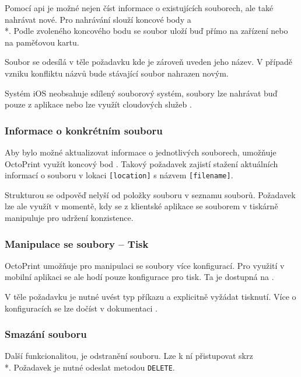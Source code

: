 Pomocí \acrshort{api} je možné nejen číst informace o existujících souborech, ale také nahrávat nové.
Pro nahrávání slouží koncové body  a\\*.
Podle zvoleného koncového bodu se soubor uloží buď přímo na zařízení nebo na paměťovou kartu.

Soubor se odesílá v těle požadavku kde je zároveň uveden jeho název.
V případě vzniku konfliktu názvů bude stávající soubor nahrazen novým.

Systém iOS neobsahuje sdílený souborový systém, soubory lze nahrávat buď pouze z aplikace nebo lze využít cloudových služeb \cite{apple-file-system-basics}.

\subsubsection*{Informace o konkrétním souboru}

Aby bylo možné aktualizovat informace o jednotlivých souborech, umožňuje OctoPrint využít koncový bod .
Takový požadavek zajistí stažení aktuálních informací o souboru v lokaci \texttt{[location]} s názvem \texttt{[filename]}.

Strukturou se odpověď nelyší od položky souboru v seznamu souborů.
Požadavek lze ale využít v momentě, kdy se z klientské aplikace se souborem v tiskárně manipuluje pro udržení konzistence.

\subsubsection*{Manipulace se soubory -- Tisk}

OctoPrint umožňuje pro manipulaci se soubory více konfigurací.
Pro využití v mobilní aplikaci se ale hodí pouze konfigurace pro tisk.
Ta je dostupná na .

V těle požadavku je nutné uvést typ příkazu a explicitně vyžádat tisknutí.
Více o konfiguracích se lze dočíst v dokumentaci \cite{octoprint-api-filecommand}.

\subsubsection*{Smazání souboru}

Další funkcionalitou, je odstranění souboru.
Lze k ní přistupovat skrz\\*.
Požadavek je nutné odeslat metodou \texttt{DELETE}.

